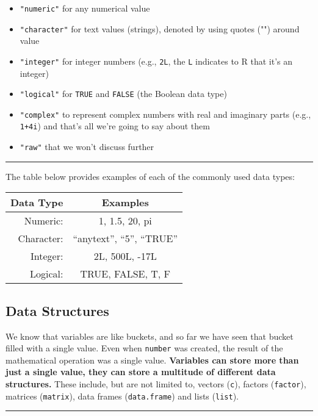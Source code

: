 \documentclass[
]{article}
\providecommand{\tightlist}{%
  \setlength{\itemsep}{0pt}\setlength{\parskip}{0pt}}
\begin{document}
\begin{itemize}
\tightlist
\item
  \texttt{"numeric"} for any numerical value
\item
  \texttt{"character"} for text values (strings), denoted by using
  quotes ("") around value\\
\item
  \texttt{"integer"} for integer numbers (e.g., \texttt{2L}, the
  \texttt{L} indicates to R that it's an integer)
\item
  \texttt{"logical"} for \texttt{TRUE} and \texttt{FALSE} (the Boolean
  data type)
\item
  \texttt{"complex"} to represent complex numbers with real and
  imaginary parts (e.g., \texttt{1+4i}) and that's all we're going to
  say about them
\item
  \texttt{"raw"} that we won't discuss further
\end{itemize}

\begin{center}\rule{0.5\linewidth}{0.5pt}\end{center}

The table below provides examples of each of the commonly used data
types:

\begin{longtable}[]{@{}rc@{}}
\toprule
Data Type & Examples\tabularnewline
\midrule
\endhead
Numeric: & 1, 1.5, 20, pi\tabularnewline
Character: & ``anytext'', ``5'', ``TRUE''\tabularnewline
Integer: & 2L, 500L, -17L\tabularnewline
Logical: & TRUE, FALSE, T, F\tabularnewline
\bottomrule
\end{longtable}

\hypertarget{data-structures}{%
\subsection{Data Structures}\label{data-structures}}

We know that variables are like buckets, and so far we have seen that
bucket filled with a single value. Even when \texttt{number} was
created, the result of the mathematical operation was a single value.
\textbf{Variables can store more than just a single value, they can
store a multitude of different data structures.} These include, but are
not limited to, vectors (\texttt{c}), factors (\texttt{factor}),
matrices (\texttt{matrix}), data frames (\texttt{data.frame}) and lists
(\texttt{list}).

\begin{center}\rule{0.5\linewidth}{0.5pt}\end{center}
\end{document}
